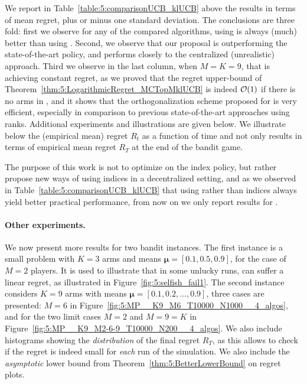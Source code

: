 We report in Table~\ref{table:5:comparisonUCB_klUCB} above the results in terms of mean regret, plus or minus one standard deviation.
The conclusions are three fold: first we observe for any of the compared algorithms, using \klUCB{} is always (much) better than using \UCB.
Second, we observe that our proposal \MCTopM{} is outperforming the state-of-the-art \RhoRand{} policy, and performs closely to the centralized (unrealistic) approach.
Third we observe in the last column, when $M=K=9$, that \MCTopM{} is achieving constant regret, as we proved that the regret upper-bound of Theorem~\ref{thm:5:LogarithmicRegret_MCTopMklUCB} is indeed $\mathcal{O}(1)$ if there is no arms in \Mworst{}, and it shows that the orthogonalization scheme proposed for \MCTopM{} is very efficient, especially in comparison to previous state-of-the-art approaches using ranks.
%
Additional experiments and illustrations are given below.
We illustrate below the (empirical mean) regret $R_t$ as a function of time and not only results in terms of empirical mean regret $R_T$ at the end of the bandit game.


The purpose of this work is not to optimize on the index policy, but rather propose new ways of using indices in a decentralized setting,
and as we observed in Table~\ref{table:5:comparisonUCB_klUCB} that using \klUCB{} rather than \UCB{} indices always yield better practical performance,
from now on we only report results for \klUCB.


\paragraph{Other experiments.}
%
We now present more results for two bandit instances.
  The first instance is a small problem with $K=3$ arms and means
  $\boldsymbol{\mu} = [0.1, 0.5, 0.9]$, for the case of $M=2$ players.
  It is used to illustrate that in some unlucky runs, \Selfish{} can suffer a linear regret, as illustrated in Figure~\ref{fig:5:selfish_fail1}.
  The second instance considers $K=9$ arms with means $\boldsymbol{\mu} = [0.1, 0.2, \dots, 0.9]$,
  three cases are presented: $M=6$ in Figure~\ref{fig:5:MP__K9_M6_T10000_N1000__4_algos},
  and for the two limit cases $M=2$ and $M=9=K$ in Figure~\ref{fig:5:MP__K9_M2-6-9_T10000_N200__4_algos}.
%
We also include histograms showing the \emph{distribution} of the final regret $R_T$,
as this allows to check if the regret is indeed small for \emph{each} run of the simulation.
%
We also include the \emph{asymptotic} lower bound from Theorem~\ref{thm:5:BetterLowerBound} on regret plots.


